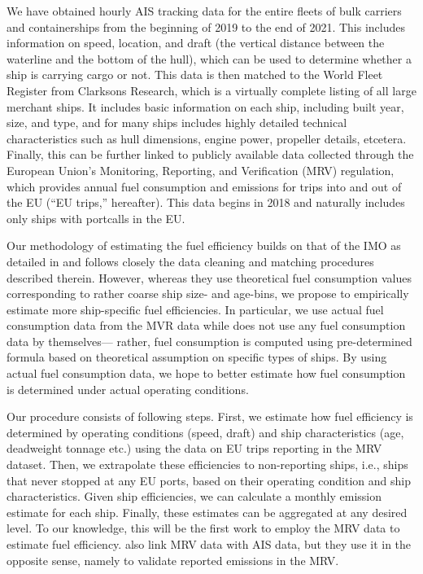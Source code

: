 \documentclass[hidelinks, 12pt,letterpaper]{article}
\begin{document}
We have obtained hourly AIS tracking data for the entire fleets of bulk carriers and containerships from the beginning of 2019 to the end of 2021. This includes information on speed, location, and draft (the vertical distance between the waterline and the bottom of the hull), which can be used to determine whether a ship is carrying cargo or not. This data is then matched to the World Fleet Register from Clarksons Research, which is a virtually complete listing of all large merchant ships. It includes basic  information on each ship, including built year, size, and type, and for many ships includes highly detailed technical characteristics such as hull dimensions, engine power, propeller details, etcetera. Finally, this can be further linked to publicly available data collected through the European Union's Monitoring, Reporting, and Verification (MRV) regulation, which provides annual fuel consumption and emissions for trips into and out of the EU (``EU trips,'' hereafter). This data begins in 2018 and naturally includes only ships with portcalls in the EU.

Our methodology of estimating the fuel efficiency builds on that of the IMO as detailed in \citet{faber2020fourth} and follows closely the data cleaning and matching procedures described therein. However, whereas they use theoretical fuel consumption values corresponding to rather coarse ship size- and age-bins, we propose to empirically estimate more ship-specific fuel efficiencies. In particular, we use actual fuel consumption data  from the MVR data while  \citet{faber2020fourth} does not use any fuel consumption data  by themselves--- rather, fuel consumption is computed using pre-determined formula based on theoretical assumption on specific types of ships. By using actual fuel consumption data, we hope to better estimate how fuel consumption is determined under actual operating conditions. 

Our procedure consists of following steps. First, we estimate how fuel efficiency is determined by operating conditions (speed, draft) and ship characteristics (age, deadweight tonnage etc.) using the data on EU trips reporting in the MRV dataset. 
Then, we extrapolate these efficiencies to non-reporting ships, i.e., ships that never stopped at any EU ports, based on their operating condition and ship characteristics. Given ship efficiencies, we can calculate a monthly emission estimate for each ship. Finally, these estimates can be aggregated at any desired level. To our knowledge, this will be the first work to employ the MRV data to estimate fuel efficiency. \citet{uge2020estimation} also link MRV data with AIS data, but they use it in the opposite sense, namely to validate reported emissions in the MRV.
\end{document}
